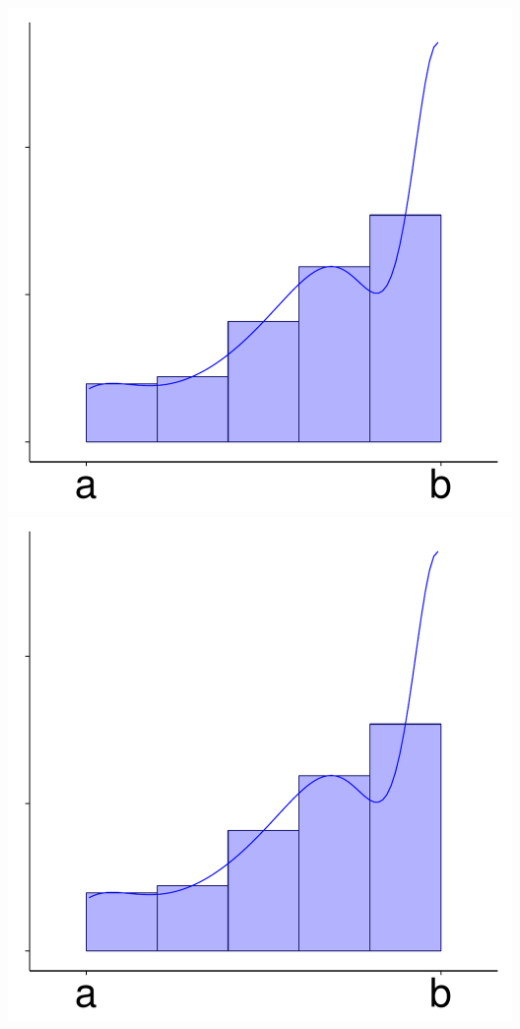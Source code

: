\documentclass[a4paper]{report}
\begin{document}
\begin{center}
\includegraphics[width=\blub,page=3]{int_graph3.pdf}
\includegraphics[width=\blub,page=4]{int_graph3.pdf}\\
\end{center}
\end{document}
